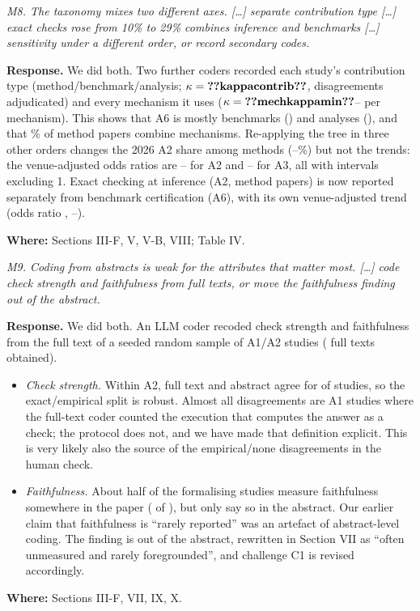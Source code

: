 \documentclass[10pt,a4paper]{article}
\newenvironment{referee}{\par\medskip\noindent\begin{minipage}{\linewidth}\color{black!65}\itshape}{\end{minipage}\par\smallskip}
\newcommand{\resp}{\noindent\textbf{Response.} }
\newcommand{\where}[1]{\par\noindent\textbf{Where:} #1\par}
\begin{document}
\begin{referee}M8. The taxonomy mixes two different axes. [\ldots] separate contribution type [\ldots] exact checks rose from 10\% to 29\% combines inference and benchmarks [\ldots] sensitivity under a different order, or record secondary codes.\end{referee}
\resp We did both. Two further coders recorded each study's contribution type (method/benchmark/analysis; $\kappa=\cnt{kappacontrib}$, disagreements adjudicated) and every mechanism it uses ($\kappa=\cnt{mechkappamin}$-- per mechanism). This shows that A6 is mostly benchmarks () and analyses (), and that \% of method papers combine mechanisms. Re-applying the tree in three other orders changes the 2026 A2 share among methods (--\%) but not the trends: the venue-adjusted odds ratios are -- for A2 and -- for A3, all with intervals excluding 1. Exact checking at inference (A2, method papers) is now reported separately from benchmark certification (A6), with its own venue-adjusted trend (odds ratio , --).
\where{Sections III-F, V, V-B, VIII; Table IV.}

\begin{referee}M9. Coding from abstracts is weak for the attributes that matter most. [\ldots] code check strength and faithfulness from full texts, or move the faithfulness finding out of the abstract.\end{referee}
\resp We did both. An LLM coder recoded check strength and faithfulness from the full text of a seeded random sample of  A1/A2 studies ( full texts obtained).
\begin{itemize}
  \item \emph{Check strength.} Within A2, full text and abstract agree for  of  studies, so the exact/empirical split is robust. Almost all disagreements are A1 studies where the full-text coder counted the execution that computes the answer as a check; the protocol does not, and we have made that definition explicit. This is very likely also the source of the empirical/none disagreements in the human check.
  \item \emph{Faithfulness.} About half of the formalising studies measure faithfulness somewhere in the paper ( of ), but only  say so in the abstract. Our earlier claim that faithfulness is ``rarely reported'' was an artefact of abstract-level coding. The finding is out of the abstract, rewritten in Section VII as ``often unmeasured and rarely foregrounded'', and challenge C1 is revised accordingly.
\end{itemize}
\where{Sections III-F, VII, IX, X.}
\end{document}
